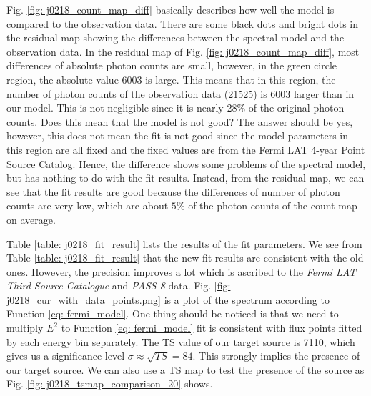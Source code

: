 \documentclass[12pt]{report}
\begin{document}
            Fig. \ref{fig: j0218_count_map_diff} basically describes how well the model is 
            compared to the observation data. There are some black dots and bright dots in 
            the residual map showing the differences between the spectral model and the 
            observation data. In the residual map of Fig. \ref{fig: j0218_count_map_diff}, 
            most differences of absolute photon counts are small, however, in the green 
            circle region, the absolute value 6003 is large. This means that in this region,
            the number of photon counts of the observation data (21525) is 6003 larger than 
            in our model. This is not negligible since it is nearly $28\%$ of the original 
            photon counts. Does this mean that the model is not good? The answer should be 
            yes, however, this does not mean the fit is not good since the model parameters 
            in this region are all fixed and the fixed values are from the Fermi LAT 4-year 
            Point Source Catalog. Hence, the difference shows some problems of the spectral 
            model, but has nothing to do with the fit results. Instead, from the residual map, 
            we can see that the fit results are good because the differences
            of number of photon counts are very low, which are about $5\%$ of the photon 
            counts of the count map on average.

            Table \ref{table: j0218_fit_result} lists the results of the fit parameters. 
            We see from Table \ref{table: j0218_fit_result} that the new fit results are 
            consistent with the old ones. However, the precision improves a lot which is 
            ascribed to the \textit{Fermi LAT Third Source Catalogue} and \textit{PASS 8} 
            data. Fig. \ref{fig: j0218_cur_with_data_points.png} is a plot of the spectrum 
            according to Function \ref{eq: fermi_model}.
            One thing should be noticed is that we need to multiply $E^2$ to Function \ref{eq: fermi_model} 
            fit is consistent with flux points fitted by each energy bin separately. 
            The TS value of our target source is 7110, which gives us 
            a significance level $\sigma \approx \sqrt{TS} = 84$. This strongly implies the presence of our
            target source. We can also use a TS map to test the presence of the source as Fig.
            \ref{fig: j0218_tsmap_comparison_20} shows. 
            
\end{document}
